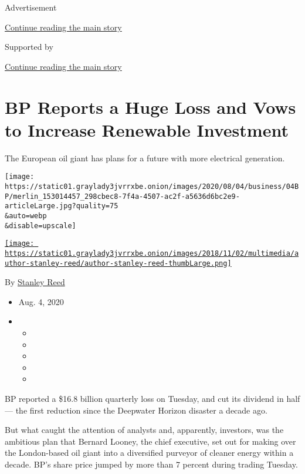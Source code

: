 Advertisement

\protect\hyperlink{after-top}{Continue reading the main story}

Supported by

\protect\hyperlink{after-sponsor}{Continue reading the main story}

\hypertarget{bp-reports-a-huge-loss-and-vows-to-increase-renewable-investment}{%
\section{BP Reports a Huge Loss and Vows to Increase Renewable
Investment}\label{bp-reports-a-huge-loss-and-vows-to-increase-renewable-investment}}

The European oil giant has plans for a future with more electrical
generation.

\texttt{[image: https://static01.graylady3jvrrxbe.onion/images/2020/08/04/business/04BP/merlin\_153014457\_298cbec8-7f4a-4507-ac2f-a5636d6bc2e9-articleLarge.jpg?quality=75\\\&auto=webp\\\&disable=upscale]}

\href{https://www.nytimes3xbfgragh.onion/by/stanley-reed}{\texttt{[image: https://static01.graylady3jvrrxbe.onion/images/2018/11/02/multimedia/author-stanley-reed/author-stanley-reed-thumbLarge.png]}}

By \href{https://www.nytimes3xbfgragh.onion/by/stanley-reed}{Stanley
Reed}

\begin{itemize}
\item
  Aug. 4, 2020
\item
  \begin{itemize}
  \item
  \item
  \item
  \item
  \item
  \end{itemize}
\end{itemize}

BP reported a \$16.8 billion quarterly loss on Tuesday, and cut its
dividend in half --- the first reduction since the Deepwater Horizon
disaster a decade ago.

But what caught the attention of analysts and, apparently, investors,
was the ambitious plan that Bernard Looney, the chief executive, set out
for making over the London-based oil giant into a diversified purveyor
of cleaner energy within a decade. BP's share price jumped by more than
7 percent during trading Tuesday.

